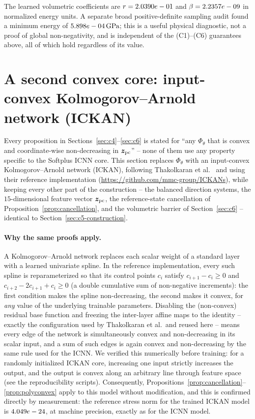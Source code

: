 \documentclass[10pt,a4paper]{article}
\begin{document}
The learned volumetric coefficients are $r=2.0390e-01$ and
$\beta=2.2357e-09$ in normalized energy units. A separate
broad positive-definite sampling audit found a minimum energy of
$5.898e-04\,\mathrm{GPa}$; this is a useful physical diagnostic, not a
proof of global non-negativity, and is independent of the (C1)--(C6)
guarantees above, all of which hold regardless of its value.

\section{A second convex core: input-convex Kolmogorov--Arnold network (ICKAN)}
\label{sec:ickan}
Every proposition in Sections~\ref{sec:c4}--\ref{sec:c6} is stated for
``any $\Phi_\theta$ that is convex and coordinate-wise non-decreasing in
$\bm z_{\rm pc}$'' -- none of them use any property specific to the
Softplus ICNN core. This section replaces $\Phi_\theta$ with an
input-convex Kolmogorov--Arnold network (ICKAN), following Thakolkaran et
al.~\cite{Thakolkaran2025} and using their reference implementation
(\url{https://github.com/mmc-group/ICKANs}), while keeping every other
part of the construction -- the balanced direction systems, the
$15$-dimensional feature vector $\bm z_{\rm pc}$, the reference-state
cancellation of Proposition~\ref{prop:cancellation}, and the volumetric
barrier of Section~\ref{sec:c6} -- identical to
Section~\ref{sec:c5-construction}.

\paragraph{Why the same proofs apply.} A Kolmogorov--Arnold network
replaces each scalar weight of a standard layer with a learned univariate
spline. In the reference implementation, every such spline is
reparameterized so that its control points $c_i$ satisfy $c_{i+1}-c_i
\geq0$ and $c_{i+2}-2c_{i+1}+c_i\geq0$ (a double cumulative sum of
non-negative increments): the first condition makes the spline
non-decreasing, the second makes it convex, for \emph{any} value of the
underlying trainable parameters. Disabling the (non-convex) residual base
function and freezing the inter-layer affine maps to the identity --
exactly the configuration used by Thakolkaran et al.\ and reused here --
means every edge of the network is simultaneously convex and
non-decreasing in its scalar input, and a sum of such edges is again
convex and non-decreasing by the same rule used for the ICNN. We verified
this numerically before training: for a randomly initialized ICKAN core,
increasing one input strictly increases the output, and the output is
convex along an arbitrary line through feature space (see the
reproducibility scripts). Consequently, Propositions~\ref{prop:cancellation}--\ref{prop:polyconvex}
apply to this model without modification, and this is confirmed directly
by measurement: the reference stress norm for the trained ICKAN model is
$4.049e-24$, at machine precision, exactly as for the
ICNN model.
\end{document}
